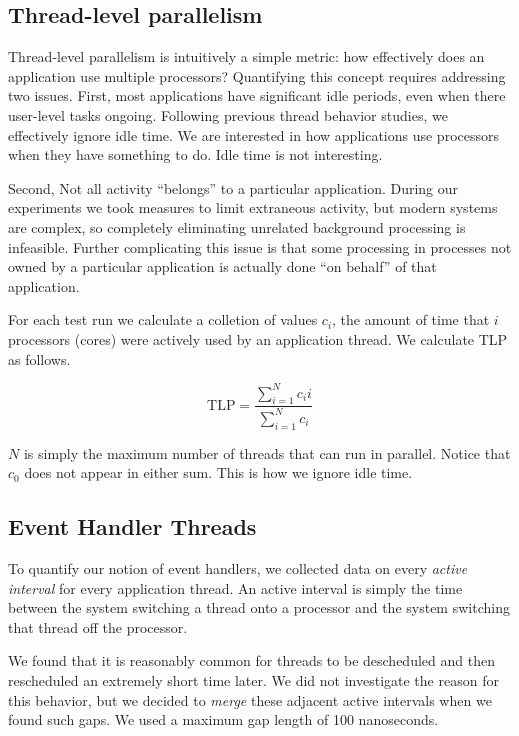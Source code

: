 \documentclass[11pt]{sigplanconf}
\begin{document}
\subsection{Thread-level parallelism}

Thread-level parallelism is intuitively a simple metric: how effectively
does an application use multiple processors?  Quantifying this concept
requires addressing two issues.  First, most applications have
significant idle periods, even when there user-level tasks ongoing.
Following previous thread behavior studies, we effectively ignore idle
time.  We are interested in how applications use processors when they
have something to do.  Idle time is not interesting.

Second, Not all activity ``belongs'' to a particular application.
During our experiments we took measures to limit extraneous activity,
but modern systems are complex, so completely eliminating unrelated
background processing is infeasible.  Further complicating this issue is
that some processing in processes not owned by a particular application
is actually done ``on behalf'' of that application.

For each test run we calculate a colletion of values $c_i$, the amount
of time that $i$ processors (cores) were actively used by an application
thread.  We calculate TLP as follows.

\begin{equation}
\mathrm{TLP} = \frac{\sum_{i=1}^N c_ii}{\sum_{i=1}^N c_i} \nonumber
\end{equation}

$N$ is simply the maximum number of threads that can run in parallel.
Notice that $c_0$ does not appear in either sum.  This is how we ignore
idle time.

\subsection{Event Handler Threads}

To quantify our notion of event handlers, we collected data on every
\emph{active interval} for every application thread.  An active interval
is simply the time between the system switching a thread onto a
processor and the system switching that thread off the processor.

We found that it is reasonably common for threads to be descheduled and
then rescheduled an extremely short time later.  We did not investigate
the reason for this behavior, but we decided to \emph{merge} these
adjacent active intervals when we found such gaps.  We used a maximum
gap length of 100 nanoseconds.
\end{document}
